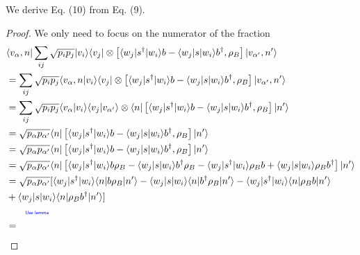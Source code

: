 \documentclass[../../note.tex]{subfiles}
\begin{document}
\begin{lemma}[Eq. (9) to Eq. (10)]
    We derive Eq. (10) from Eq. (9).
\end{lemma}
\begin{proof}
    We only need to focus on the numerator of the fraction 
    \begin{align}
        &\langle v_{\alpha}, n \vert \sum_{i j} \sqrt{p_i p_j} \vert v_i \rangle \langle v_j \vert \otimes \left[\langle w_j \vert s^\dagger \vert w_i \rangle b - \langle w_j \vert s \vert w_i \rangle  b^\dagger, \rho_B \right] \vert v_{\alpha^\prime}, n^\prime \rangle \\
        &= \sum_{ij} \sqrt{p_i p_j} \langle v_{\alpha}, n \vert v_i \rangle \langle v_j \vert \otimes \left[\langle w_j \vert s^\dagger \vert w_i \rangle b - \langle w_j \vert s \vert w_i \rangle b^\dagger, \rho_B \right] \vert v_{\alpha^\prime},n^\prime \rangle \\
        &= \sum_{ij} \sqrt{p_i p_j} \langle v_{\alpha} \vert v_i \rangle \langle v_j \vert v_{\alpha^\prime} \rangle \otimes \langle n \vert \left[\langle w_j \vert s^\dagger \vert w_i \rangle b - \langle w_j \vert s \vert w_i \rangle b^\dagger, \rho_B \right] \vert n^\prime \rangle \\
        &= \sqrt{p_{\alpha} p_{\alpha^{\prime}}} \langle n \vert \left[\langle w_j \vert s^\dagger \vert w_i \rangle b - \langle w_j \vert s \vert w_i \rangle b^\dagger, \rho_B \right] \vert n^\prime \rangle \\
        &=  \sqrt{p_{\alpha} p_{\alpha^{\prime}}} \langle n \vert \left[\langle w_j \vert s^\dagger \vert w_i \rangle b - \langle w_j \vert s \vert w_i \rangle b^\dagger, \rho_B \right] \vert n^\prime \rangle \\
        &= \sqrt{p_{\alpha} p_{\alpha^\prime}} \langle n \vert \left[ \langle w_j \vert s^\dagger \vert w_i \rangle b \rho_B - \langle w_j \vert s\vert w_i \rangle b^\dagger \rho_B - \langle w_j \vert s^\dagger \vert w_i \rangle \rho_B b + \langle w_j \vert s\vert w_i \rangle \rho_B b^\dagger  \right] \vert n^\prime \rangle \\
        &= \sqrt{p_{\alpha} p_{\alpha^\prime}} [\langle w_j \vert s^\dagger \vert w_i \rangle \langle n \vert b \rho_B \vert n^\prime \rangle - \langle w_j \vert s\vert w_i \rangle \langle n \vert b^\dagger \rho_B \vert n^\prime \rangle - \langle w_j \vert s^\dagger \vert w_i \rangle \langle n \vert \rho_B b \vert n^\prime \rangle \nonumber \\
        &+ \langle w_j \vert s\vert w_i \rangle \langle n \vert \rho_B b^\dagger \vert n^\prime \rangle ] \\
        &\qquad\text{\color{blue}{\tiny\sffamily Use lemma }} \nonumber \\
        &= 
    \end{align}
\end{proof}
\end{document}
